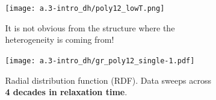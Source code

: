 \begin{frame}[c]
\begin{columns}
\begin{column}{0.5\textwidth}
\begin{figure}[t]
\end{figure}





\end{column}

\begin{column}{0.5\textwidth}
\centering  {}


\begin{figure}[t]
\begin{overprint}
\centering\texttt{[image: a.3-intro\_dh/poly12\_lowT.png]}\caption{It is not obvious from the structure where the heterogeneity is coming from!}
\centering\texttt{[image: a.3-intro\_dh/gr\_poly12\_single-1.pdf]}
\caption{Radial distribution function (RDF). Data sweeps across \textbf{4 decades in relaxation time}.}

\end{overprint}

\end{figure}



\end{column}
\end{columns}
\end{frame} 